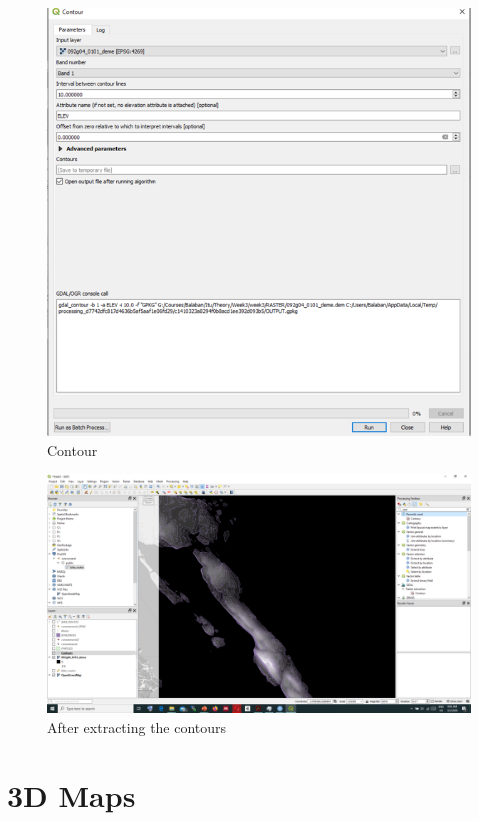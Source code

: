 \documentclass[
]{book}
\begin{document}
\begin{figure}
\centering
\includegraphics{Images/Contour.png}
\caption{Contour}
\end{figure}

\begin{figure}
\centering
\includegraphics{Images/Contoursfinished.png}
\caption{After extracting the contours}
\end{figure}

\hypertarget{d-maps}{%
\chapter{3D Maps}\label{d-maps}}
\end{document}
